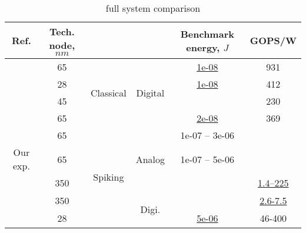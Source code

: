 \documentclass[conference, compsoc]{IEEEtran}
\begin{document}
\begin{table}[h]
	\caption{full system comparison}
	\label{table:3}
	\centering
	\setlength{\tabcolsep}{5pt}
	\begin{tabular} {|c|c|c|c|c|c|}
		\hline Ref. &  \pbox[t]{40pt}{Tech. node,\\ $ nm $} & & & \pbox[t]{40pt}{Benchmark\\energy, $ J $} & GOPS/W \\ 
		\hline \cite{DianNao} & 65 & \multirow{4}{*}{\begin{turn}{90}Classical\end{turn}} & \multirow{4}{*}{\begin{turn}{90}Digital\end{turn}} & \underline{1e-08} & 931 \\
		\cline{1-2}\cline{5-6} \cite{HWCE} & 28 &  &  & \underline{1e-08} & 412 \\
		\cline{1-2}\cline{5-6} \cite{NeuFlow} & 45 &  &  &  & 230 \\
		\cline{1-2}\cline{5-6} \cite{Origami} & 65 &  &  & \underline{2e-08} & 369 \\
		\hline \cite{12p} & 65 & \multirow{5}{*}{\begin{turn}{90}Spiking\end{turn}} & \multirow{3}{*}{\begin{turn}{90}Analog\end{turn}} & 1e-07 -- 3e-06 &  \\
		\cline{1-2}\cline{5-6} Our exp. & 65 &  &  & 1e-07 -- 5e-06 &  \\
		\cline{1-2}\cline{5-6} \cite{CAVIAR}\cite{DVS_analog} & 350 &  &  &  & \underline{1.4--225} \\	
		\cline{1-2}\cline{4-6} \cite{DVS_digital} & 350 &  & \multirow{2}{*}{\begin{turn}{90}Digi.\end{turn}} &  & \underline{2.6-7.5} \\
		\cline{1-2}\cline{5-6} \cite{TrueNorth} & 28 &  &  & \underline{5e-06} & 46-400 \\				
		\hline
	\end{tabular} 
\end{table}
\end{document}
